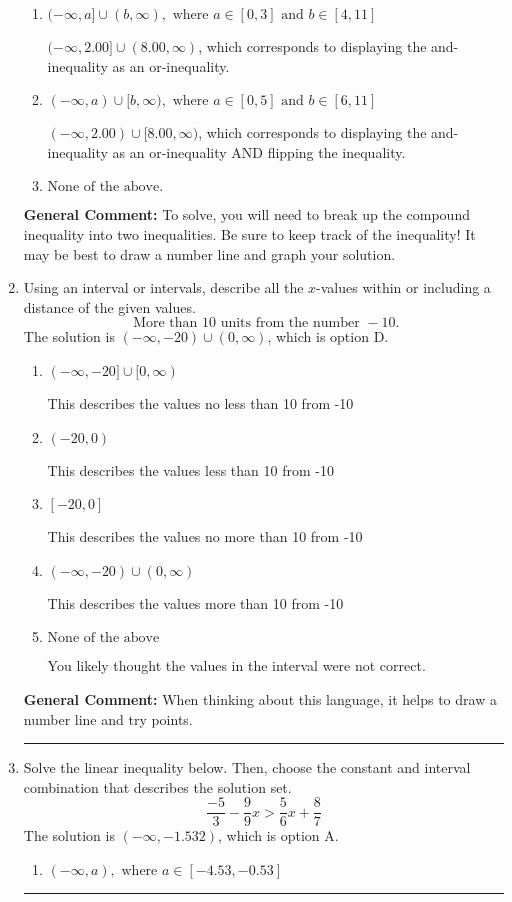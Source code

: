 \documentclass{extbook}[14pt]
\newcommand{\litem}[1]{\item #1

\rule{\textwidth}{0.4pt}}
\begin{document}
\begin{enumerate}
{\begin{enumerate}[label=\Alph*.]
$[2.00, 8.00)$, which is the correct option.
\item \( (-\infty, a] \cup (b, \infty), \text{ where } a \in [0, 3] \text{ and } b \in [4, 11] \)

$(-\infty, 2.00] \cup (8.00, \infty)$, which corresponds to displaying the and-inequality as an or-inequality.
\item \( (-\infty, a) \cup [b, \infty), \text{ where } a \in [0, 5] \text{ and } b \in [6, 11] \)

$(-\infty, 2.00) \cup [8.00, \infty)$, which corresponds to displaying the and-inequality as an or-inequality AND flipping the inequality.
\item \( \text{None of the above.} \)


\end{enumerate}

\textbf{General Comment:} To solve, you will need to break up the compound inequality into two inequalities. Be sure to keep track of the inequality! It may be best to draw a number line and graph your solution.
}
\litem{
Using an interval or intervals, describe all the $x$-values within or including a distance of the given values.
\[ \text{ More than } 10 \text{ units from the number } -10. \]
The solution is \( (-\infty, -20) \cup (0, \infty) \), which is option D.\begin{enumerate}[label=\Alph*.]
\item \( (-\infty, -20] \cup [0, \infty) \)

This describes the values no less than 10 from -10
\item \( (-20, 0) \)

This describes the values less than 10 from -10
\item \( [-20, 0] \)

This describes the values no more than 10 from -10
\item \( (-\infty, -20) \cup (0, \infty) \)

This describes the values more than 10 from -10
\item \( \text{None of the above} \)

You likely thought the values in the interval were not correct.
\end{enumerate}

\textbf{General Comment:} When thinking about this language, it helps to draw a number line and try points.
}
\litem{
Solve the linear inequality below. Then, choose the constant and interval combination that describes the solution set.
\[ \frac{-5}{3} - \frac{9}{9} x > \frac{5}{6} x + \frac{8}{7} \]
The solution is \( (-\infty, -1.532) \), which is option A.\begin{enumerate}[label=\Alph*.]
\item \( (-\infty, a), \text{ where } a \in [-4.53, -0.53] \)


\end{enumerate}}
\end{enumerate}
\end{document}
